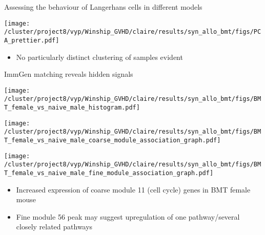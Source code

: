 \documentclass[final,hyperref={pdfpagelabels=false}]{beamer}
\begin{document}
\begin{frame}{}
\begin{columns}[t]
\begin{column}{.36\linewidth}
\begin{block}{Assessing the behaviour of Langerhans cells in different models}
  \begin{minipage}{0.6\textwidth}
   \texttt{[image: /cluster/project8/vyp/Winship\_GVHD/claire/results/syn\_allo\_bmt/figs/PCA\_prettier.pdf]}
      \end{minipage}
  \begin{minipage}{0.3\textwidth}
{\small             \begin{itemize}
    \item No particularly distinct clustering of samples evident
          \end{itemize}}
  \end{minipage}
\end{block}

\begin{block}{ImmGen matching reveals hidden signals}

  
      \begin{minipage}{0.30\textwidth}
        \texttt{[image: /cluster/project8/vyp/Winship\_GVHD/claire/results/syn\_allo\_bmt/figs/BMT\_female\_vs\_naive\_male\_histogram.pdf]}
      \end{minipage}
  \hfill 
\begin{minipage}{0.30\textwidth}
        \texttt{[image: /cluster/project8/vyp/Winship\_GVHD/claire/results/syn\_allo\_bmt/figs/BMT\_female\_vs\_naive\_male\_coarse\_module\_association\_graph.pdf]}
      \end{minipage}
\hfill
\begin{minipage}{0.30\textwidth}
        \texttt{[image: /cluster/project8/vyp/Winship\_GVHD/claire/results/syn\_allo\_bmt/figs/BMT\_female\_vs\_naive\_male\_fine\_module\_association\_graph.pdf]}
      \end{minipage}
{\small \begin{itemize}
\item Increased expression of coarse module 11 (cell cycle) genes in BMT female mouse 
\item Fine module 56 peak may suggest upregulation of one pathway/several closely related pathways 
\end{itemize}}


\end{block}
\end{column}
\end{columns}
\end{frame}
\end{document}
